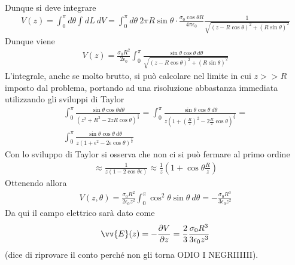 \documentclass[a4paper, oneside]{article}
\begin{document}
\begin{example}[Esercizio 1 20/2/2012]
\begin{gather*}
    \end{gather*}
    Dunque si deve integrare
    \begin{gather*}
        V(z) = \int_{0}^{\pi} d\theta \int_{}^{} dL \ dV = \int_{0}^{\pi} d\theta \ 2\pi R \sin\theta \cdot \frac{\sigma_0 \cos\theta R}{4\pi\epsilon_0} \frac{1}{\sqrt{(z - R\cos\theta)^{2} + (R\sin\theta)^{2}} }
    \end{gather*}
    Dunque viene
    \begin{gather*}
        V(z) = \frac{\sigma_0 R^{2}}{2\epsilon_0} \int_{0}^{\pi} \frac{\sin\theta \cos\theta \ d\theta}{\sqrt{(z - R\cos\theta)^{2} + (R\sin\theta)^{2}} }
    \end{gather*}
    L'integrale, anche se molto brutto, si può calcolare nel limite in cui $z >>R $ imposto dal problema, 
    portando ad una risoluzione abbastanza immediata utilizzando gli sviluppi di Taylor
    \begin{gather*}
        \int_{0}^{\pi} \frac{\sin\theta\cos\theta d\theta}{\left(z^{2} + R^{2} - 2zR\cos\theta\right)^{\frac{1}{2}}} = \int_{0}^{\pi} \frac{\sin\theta\cos\theta  \ d\theta}{z\left(1 + \left(\frac{R}{z}\right)^{2} - 2\frac{R}{z} \cos\theta \right)^{\frac{1}{2}}}  = \\
        \int_{0}^{\pi} \frac{\sin\theta \cos\theta \ d\theta}{z\left(1 + \epsilon^{2} -2\epsilon\cos\theta\right)^{\frac{1}{2}}}   
    \end{gather*}
    Con lo sviluppo di Taylor si osserva che non ci si può fermare al primo ordine
    \begin{gather*}
        \approx \frac{1}{z\left(1 - 2\cos\theta \epsilon\right)} \approx \frac{1}{z} \left(1 + \cos\theta \frac{R}{z}\right)
    \end{gather*}
    Ottenendo allora 
    \begin{gather*}
        V(z, \theta) = \frac{\sigma_0 R^{2}}{2\epsilon_0 z^{2}}\int_{0}^{\pi} \cos^{2}\theta \sin\theta \ d\theta = - \frac{\sigma_0 R^{3}}{3\epsilon_0  z^{2}}
    \end{gather*}
    Da qui il campo elettrico sarà dato come
    \begin{gather*}
        \vv{E} (z) = -\frac{\partial V}{\partial z} = \frac{2}{3} \frac{\sigma_0 R^{3}}{3\epsilon_0 z^{3}}  
    \end{gather*}
    (dice di riprovare il conto perché non gli torna ODIO I NEGRIIIIII).
\end{example}
\end{document}
